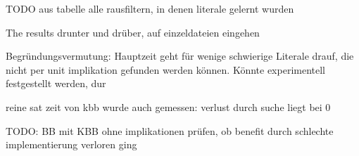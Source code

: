 TODO aus tabelle alle rausfiltern, in denen literale gelernt wurden


The results drunter und drüber, auf einzeldateien eingehen

Begründungsvermutung: Hauptzeit geht für wenige schwierige Literale drauf, die nicht per unit implikation gefunden werden können. Könnte experimentell festgestellt werden, dur



reine sat zeit von kbb wurde auch gemessen: verlust durch suche liegt bei 0

TODO: BB mit KBB ohne implikationen prüfen, ob benefit durch schlechte implementierung verloren ging
